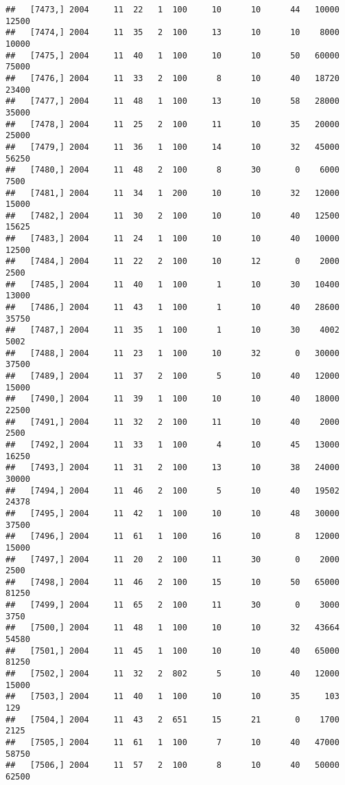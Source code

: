 \documentclass{article}\usepackage[]{graphicx}\usepackage[]{color}
\makeatletter
\newenvironment{kframe}{%
 \def\at@end@of@kframe{}%
 \ifinner\ifhmode%
  \def\at@end@of@kframe{\end{minipage}}%
  \begin{minipage}{\columnwidth}%
 \fi\fi%
 \def\FrameCommand##1{\hskip\@totalleftmargin \hskip-\fboxsep
 \colorbox{shadecolor}{##1}\hskip-\fboxsep
     \hskip-\linewidth \hskip-\@totalleftmargin \hskip\columnwidth}%
 \MakeFramed {\advance\hsize-\width
   \@totalleftmargin\z@ \linewidth\hsize
   \@setminipage}}%
 {\par\unskip\endMakeFramed%
 \at@end@of@kframe}
\newenvironment{knitrout}{}{} %
\makeatother
\begin{document}
\begin{knitrout}
\begin{kframe}
\begin{verbatim}
##   [7473,] 2004     11  22   1  100     10      10      44   10000   12500
##   [7474,] 2004     11  35   2  100     13      10      10    8000   10000
##   [7475,] 2004     11  40   1  100     10      10      50   60000   75000
##   [7476,] 2004     11  33   2  100      8      10      40   18720   23400
##   [7477,] 2004     11  48   1  100     13      10      58   28000   35000
##   [7478,] 2004     11  25   2  100     11      10      35   20000   25000
##   [7479,] 2004     11  36   1  100     14      10      32   45000   56250
##   [7480,] 2004     11  48   2  100      8      30       0    6000    7500
##   [7481,] 2004     11  34   1  200     10      10      32   12000   15000
##   [7482,] 2004     11  30   2  100     10      10      40   12500   15625
##   [7483,] 2004     11  24   1  100     10      10      40   10000   12500
##   [7484,] 2004     11  22   2  100     10      12       0    2000    2500
##   [7485,] 2004     11  40   1  100      1      10      30   10400   13000
##   [7486,] 2004     11  43   1  100      1      10      40   28600   35750
##   [7487,] 2004     11  35   1  100      1      10      30    4002    5002
##   [7488,] 2004     11  23   1  100     10      32       0   30000   37500
##   [7489,] 2004     11  37   2  100      5      10      40   12000   15000
##   [7490,] 2004     11  39   1  100     10      10      40   18000   22500
##   [7491,] 2004     11  32   2  100     11      10      40    2000    2500
##   [7492,] 2004     11  33   1  100      4      10      45   13000   16250
##   [7493,] 2004     11  31   2  100     13      10      38   24000   30000
##   [7494,] 2004     11  46   2  100      5      10      40   19502   24378
##   [7495,] 2004     11  42   1  100     10      10      48   30000   37500
##   [7496,] 2004     11  61   1  100     16      10       8   12000   15000
##   [7497,] 2004     11  20   2  100     11      30       0    2000    2500
##   [7498,] 2004     11  46   2  100     15      10      50   65000   81250
##   [7499,] 2004     11  65   2  100     11      30       0    3000    3750
##   [7500,] 2004     11  48   1  100     10      10      32   43664   54580
##   [7501,] 2004     11  45   1  100     10      10      40   65000   81250
##   [7502,] 2004     11  32   2  802      5      10      40   12000   15000
##   [7503,] 2004     11  40   1  100     10      10      35     103     129
##   [7504,] 2004     11  43   2  651     15      21       0    1700    2125
##   [7505,] 2004     11  61   1  100      7      10      40   47000   58750
##   [7506,] 2004     11  57   2  100      8      10      40   50000   62500

\end{verbatim}
\end{kframe}
\end{knitrout}
\end{document}
